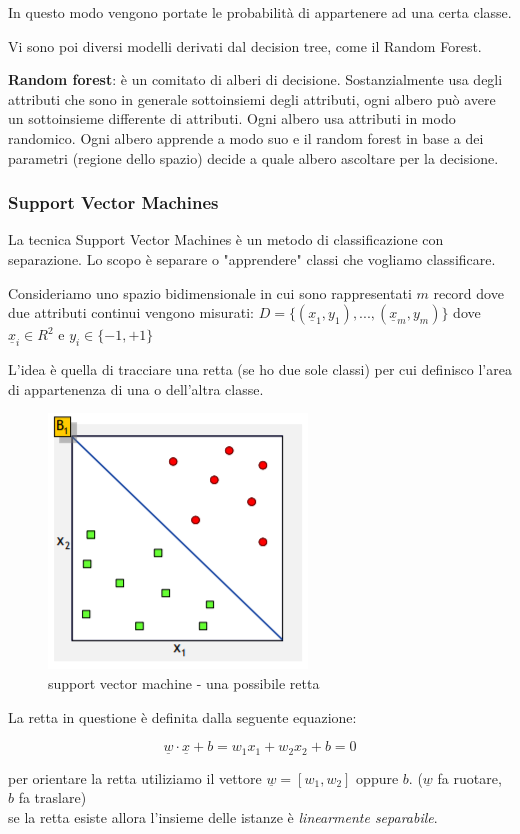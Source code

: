 In questo modo vengono portate le probabilità di appartenere ad una certa classe.	

Vi sono poi diversi modelli derivati dal decision tree, come il Random Forest.
 
\textbf{Random forest}: \`e un comitato di alberi di decisione. Sostanzialmente usa degli attributi che sono in generale sottoinsiemi degli attributi, ogni albero può avere un sottoinsieme differente di attributi. Ogni albero usa attributi in modo randomico. Ogni albero apprende a modo suo e il random forest in base a dei parametri (regione dello spazio) decide a quale albero ascoltare per la decisione. 

\subsubsection{Support Vector Machines}
La tecnica Support Vector Machines è un metodo di classificazione con separazione. Lo scopo \`e separare o "apprendere" classi che vogliamo classificare. 

Consideriamo uno spazio bidimensionale in cui sono rappresentati $m$ record dove due attributi continui vengono misurati: $D = \{(\underline{x}_1, y_1),...,(\underline{x}_m, y_m)\}$ dove $\underline{x}_i \in R^2$ e $y_i \in \{-1, +1\}$

L'idea è quella di tracciare una retta (se ho due sole classi) per cui definisco l'area di appartenenza di una o dell'altra classe. 

\begin{figure}[H]
	\centering
	\includegraphics[height=0.4 \linewidth]{classification/pict/svm.png}
	\caption{support vector machine - una possibile retta}
\end{figure}

La retta in questione è definita dalla seguente equazione:

\[\underline{w} \cdot \underline{x} + b = w_1 x_1 + w_2 x_2 + b = 0\]

per orientare la retta utiliziamo il vettore $\underline{w} = [w_1,w_2]$ oppure $b$. ($\underline{w}$ fa ruotare, $b$ fa traslare)\\
se la retta esiste allora l'insieme delle istanze è \textit{linearmente separabile}.


